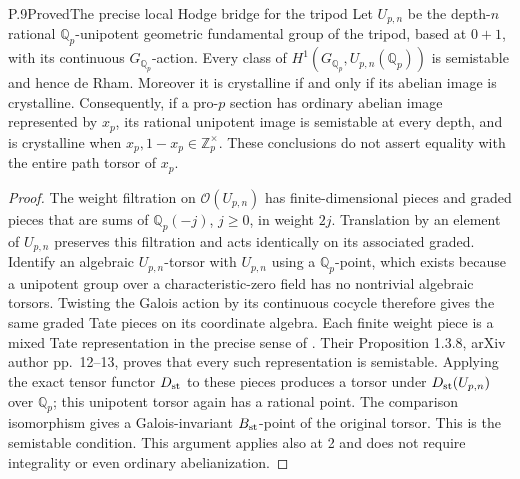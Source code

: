 \begin{result}{P.9}{Proved}{The precise local Hodge bridge for the tripod}
Let \(U_{p,n}\) be the depth-\(n\) rational \(\mathbb Q_p\)-unipotent
geometric fundamental group of the tripod, based at \(0+1\), with its
continuous \(G_{\mathbb Q_p}\)-action. Every class of
\(H^1(G_{\mathbb Q_p},U_{p,n}(\mathbb Q_p))\) is semistable and
hence de Rham. Moreover it is crystalline if and only if its abelian
image is crystalline. Consequently, if a pro-\(p\) section has ordinary
abelian image represented by \(x_p\), its rational unipotent image is
semistable at every depth, and is crystalline when
\(x_p,1-x_p\in\mathbb Z_p^\times\).
These conclusions do not assert equality with the entire path torsor
of \(x_p\).
\end{result}
\begin{proof}
The weight filtration on \(\mathcal O(U_{p,n})\) has finite-dimensional
pieces and graded pieces that are sums of \(\mathbb Q_p(-j)\),
\(j\ge0\), in weight \(2j\). Translation by an element of
\(U_{p,n}\) preserves this filtration and acts identically on its
associated graded. Identify an algebraic \(U_{p,n}\)-torsor with
\(U_{p,n}\) using a \(\mathbb Q_p\)-point, which exists because a
unipotent group over a characteristic-zero field has no nontrivial
algebraic torsors. Twisting the Galois action by its continuous cocycle
therefore gives the same graded Tate pieces on its coordinate algebra.
Each finite weight piece is a mixed Tate representation in the precise
sense of \citet[Definition 1.3.7]{LitChatzistamatiouUnver2013}.
Their Proposition 1.3.8, arXiv author pp.~12--13, proves that every such
representation is semistable. Applying the exact tensor functor
\(D_{\rm st}\) to these pieces produces a torsor under
\(D_{\rm st}(U_{p,n})\) over \(\mathbb Q_p\); this unipotent
torsor again has a rational point. The comparison isomorphism gives
a Galois-invariant \(B_{\rm st}\)-point of the original torsor.
This is the semistable condition. This argument applies also at 2 and
does not require integrality or even ordinary abelianization.


\end{proof}
